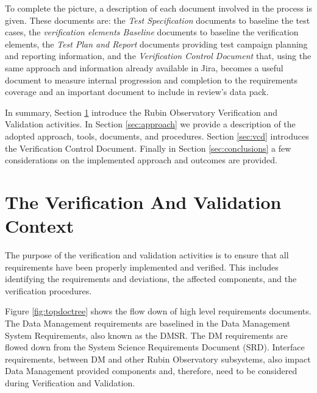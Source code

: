 To complete the picture, a description of each document involved in the process is given. These documents are: 
the \textit{Test Specification} documents to baseline the test cases, 
the \textit{verification elements Baseline} documents to baseline the verification elements, 
the \textit{Test Plan and Report} documents providing test campaign planning and reporting information,
and the \textit{Verification Control Document} that, using the same approach and information already available in Jira, 
becomes a useful document to measure internal progression and completion to the requirements coverage 
and an important document to include in review's data pack. 

In summary, Section \ref{sec:vandvproblem} introduce the Rubin Observatory Verification and Validation activities.
In Section \ref{sec:approach} we provide a description of the adopted approach, tools, documents, and procedures. 
Section \ref{sec:vcd} introduces the Verification Control Document. 
Finally in Section \ref{sec:conclusions} a few considerations on the implemented approach and outcomes are provided.


\section{The Verification And Validation Context}
\label{sec:vandvproblem}

The purpose of the verification and validation activities is to ensure that all requirements have been properly implemented and verified.
This includes identifying the requirements and deviations, the affected components, and the verification procedures.

Figure \ref{fig:topdoctree} shows the flow down of high level requirements documents.
The Data Management requirements are baselined in the Data Management System Requirements\cite{LSE-61}, also known as the DMSR.
The DM requirements are flowed down from the System Science Requirements Document (SRD)\cite{LPM-17}. Interface requirements,
between DM and other Rubin Observatory subsystems, also impact Data Management provided components and, therefore,
need to be considered during Verification and Validation.

